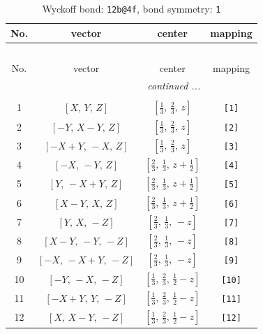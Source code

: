 \documentclass[fleqn,8pt]{jsarticle}
\begin{document}
\begin{longtable}{cccc}
\caption{Wyckoff bond: {\tt 12b@4f}, bond symmetry: {\tt 1}}
 \\
 \hline \hline
No. & vector & center & mapping \\ \hline \endfirsthead

\multicolumn{3}{l}{\tablename\ \thetable{}} \\
 \hline \hline
No. & vector & center & mapping \\ \hline \endhead

 \hline \hline
\multicolumn{3}{r}{\footnotesize\it continued ...} \\ \endfoot

 \hline \hline
\multicolumn{3}{r}{} \\ \endlastfoot

1 & $\left[ X,\, Y,\, Z \right]$ & $\left[ \frac{1}{3},\, \frac{2}{3},\, z \right]$ & {\tt [1]} \\ \hline
2 & $\left[ - Y,\, X - Y,\, Z \right]$ & $\left[ \frac{1}{3},\, \frac{2}{3},\, z \right]$ & {\tt [2]} \\ \hline
3 & $\left[ - X + Y,\, - X,\, Z \right]$ & $\left[ \frac{1}{3},\, \frac{2}{3},\, z \right]$ & {\tt [3]} \\ \hline
4 & $\left[ - X,\, - Y,\, Z \right]$ & $\left[ \frac{2}{3},\, \frac{1}{3},\, z + \frac{1}{2} \right]$ & {\tt [4]} \\ \hline
5 & $\left[ Y,\, - X + Y,\, Z \right]$ & $\left[ \frac{2}{3},\, \frac{1}{3},\, z + \frac{1}{2} \right]$ & {\tt [5]} \\ \hline
6 & $\left[ X - Y,\, X,\, Z \right]$ & $\left[ \frac{2}{3},\, \frac{1}{3},\, z + \frac{1}{2} \right]$ & {\tt [6]} \\ \hline
7 & $\left[ Y,\, X,\, - Z \right]$ & $\left[ \frac{2}{3},\, \frac{1}{3},\, - z \right]$ & {\tt [7]} \\ \hline
8 & $\left[ X - Y,\, - Y,\, - Z \right]$ & $\left[ \frac{2}{3},\, \frac{1}{3},\, - z \right]$ & {\tt [8]} \\ \hline
9 & $\left[ - X,\, - X + Y,\, - Z \right]$ & $\left[ \frac{2}{3},\, \frac{1}{3},\, - z \right]$ & {\tt [9]} \\ \hline
10 & $\left[ - Y,\, - X,\, - Z \right]$ & $\left[ \frac{1}{3},\, \frac{2}{3},\, \frac{1}{2} - z \right]$ & {\tt [10]} \\ \hline
11 & $\left[ - X + Y,\, Y,\, - Z \right]$ & $\left[ \frac{1}{3},\, \frac{2}{3},\, \frac{1}{2} - z \right]$ & {\tt [11]} \\ \hline
12 & $\left[ X,\, X - Y,\, - Z \right]$ & $\left[ \frac{1}{3},\, \frac{2}{3},\, \frac{1}{2} - z \right]$ & {\tt [12]} \\
\end{longtable}
\end{document}
